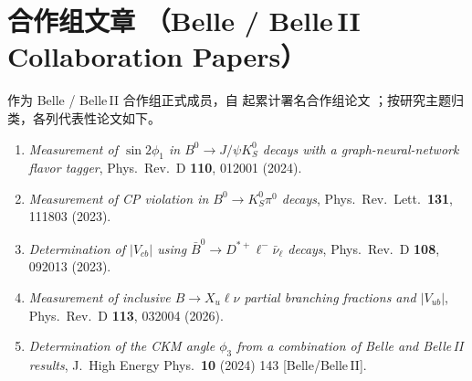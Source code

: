 \documentclass[a4paper,11pt,fontset=none]{ctexart}
\begin{document}
\section{合作组文章 \normalfont\small（Belle / Belle\,II Collaboration Papers）}

{\small 作为 Belle / Belle\,II 合作组正式成员，自 起累计署名合作组论文 ；按研究主题归类，各列代表性论文如下。}

{\small\setlength{\emergencystretch}{3em}

\smallskip
\noindent{}
\begin{enumerate}\setlength{\itemsep}{1.5pt}
  \item \textit{Measurement of $\sin 2\phi_{1}$ in $B^{0}\!\to J/\psi K_{S}^{0}$ decays with a graph-neural-network flavor tagger}, Phys.\ Rev.\ D \textbf{110}, 012001 (2024)\;[Belle\,II].
  \item \textit{Measurement of CP violation in $B^{0}\!\to K_{S}^{0}\pi^{0}$ decays}, Phys.\ Rev.\ Lett.\ \textbf{131}, 111803 (2023)\;[Belle\,II].
  \item \textit{Determination of $|V_{cb}|$ using $\bar{B}^{0}\!\to D^{*+}\ell^{-}\bar\nu_{\ell}$ decays}, Phys.\ Rev.\ D \textbf{108}, 092013 (2023)\;[Belle\,II].
  \item \textit{Measurement of inclusive $B\!\to X_{u}\ell\nu$ partial branching fractions and $|V_{ub}|$}, Phys.\ Rev.\ D \textbf{113}, 032004 (2026)\;[Belle\,II].
  \item \textit{Determination of the CKM angle $\phi_{3}$ from a combination of Belle and Belle\,II results}, J.\ High Energy Phys.\ \textbf{10} (2024) 143 [Belle/Belle\,II].
\end{enumerate}

}
\end{document}
